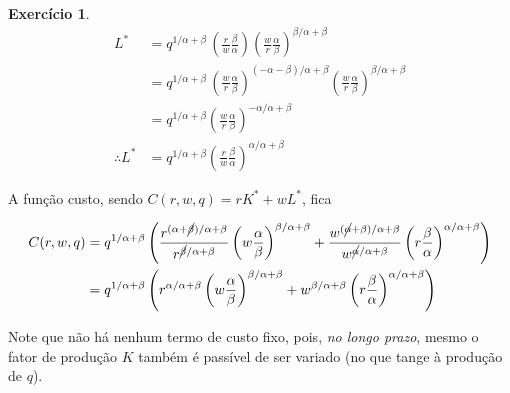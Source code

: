 \documentclass[12pt]{article}
\numberwithin{equation}{section}
\theoremstyle{plain}
\theoremstyle{definition}
\newtheorem{exercise}{Exercício}
\theoremstyle{remark}
\begin{document}
\begin{exercise}
\begin{align*}
L^{*} &= q^{1/\alpha+\beta} \, \left( \frac{r}{w} \frac{\beta}{\alpha}  \right) \left( \frac{w}{r} \frac{\alpha}{\beta} \right)^{\beta/\alpha+\beta} \\
&= q^{1/\alpha+\beta} \, \left( \frac{w}{r} \frac{\alpha}{\beta} \right)^{(-\alpha-\beta)/\alpha+\beta} \left( \frac{w}{r} \frac{\alpha}{\beta} \right)^{\beta/\alpha+\beta} \\
&= q^{1/\alpha+\beta} \left( \frac{w}{r} \frac{\alpha}{\beta} \right)^{-\alpha/\alpha+\beta} \\
\therefore L^{*} &= q^{1/\alpha+\beta} \left( \frac{r}{w} \frac{\beta}{\alpha}  \right)^{\alpha/\alpha+\beta}
\end{align*}

A função custo, sendo \(C(r,w,q) = r K^{*} + w L^{*}\), fica

\begin{align*}
C(r,w,q) &= q^{1/\alpha+\beta} \left( \frac{r^{(\alpha+\cancel{ \beta })/\alpha+\beta}}{r^{\cancel{ \beta }/\alpha+\beta}} \left( w \frac{\alpha}{\beta} \right)^{\beta/\alpha+\beta} + \frac{w^{(\cancel{ \alpha }+\beta)/\alpha+\beta}}{w^{\cancel{ \alpha }/\alpha+\beta}}\left( r \frac{\beta}{\alpha} \right)^{\alpha/\alpha+\beta} \right) \\
&= q^{1/\alpha+\beta} \left( r^{\alpha/\alpha+\beta} \left( w \frac{\alpha}{\beta} \right)^{\beta/\alpha+\beta} + w^{\beta/\alpha+\beta} \left( r \frac{\beta}{\alpha} \right)^{\alpha/\alpha+\beta} \right)
\end{align*}

Note que não há nenhum termo de custo fixo, pois, \textit{no longo
prazo}, mesmo o fator de produção \(K\) também é passível de ser variado
(no que tange à produção de \(q\)).
\end{exercise}
\end{document}
